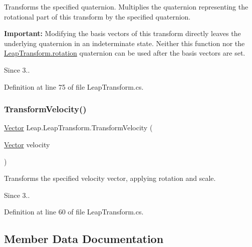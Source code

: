 Transforms the specified quaternion. Multiplies the quaternion representing the rotational part of this transform by the specified quaternion. 

{\bfseries{Important\+:}} Modifying the basis vectors of this transform directly leaves the underlying quaternion in an indeterminate state. Neither this function nor the \mbox{\hyperlink{struct_leap_1_1_leap_transform_a69917840386ec2421d3886be4ec7833a}{Leap\+Transform.\+rotation}} quaternion can be used after the basis vectors are set.

\begin{DoxySince}{Since}
3.. 
\end{DoxySince}


Definition at line 75 of file Leap\+Transform.\+cs.

\mbox{\label{struct_leap_1_1_leap_transform_a415819fca9f811c44dc5d855b2099f61}} 
\subsubsection{\texorpdfstring{TransformVelocity()}{TransformVelocity()}}
{\footnotesize\ttfamily \mbox{\hyperlink{struct_leap_1_1_vector}{Vector}} Leap.\+Leap\+Transform.\+Transform\+Velocity (\begin{DoxyParamCaption}\item[{\mbox{\hyperlink{struct_leap_1_1_vector}{Vector}}}]{velocity }\end{DoxyParamCaption})}



Transforms the specified velocity vector, applying rotation and scale. 

\begin{DoxySince}{Since}
3.. 
\end{DoxySince}


Definition at line 60 of file Leap\+Transform.\+cs.



\subsection{Member Data Documentation}
\mbox{\label{struct_leap_1_1_leap_transform_a10de68df5cf1afa89c273a33d0629f16}} 
